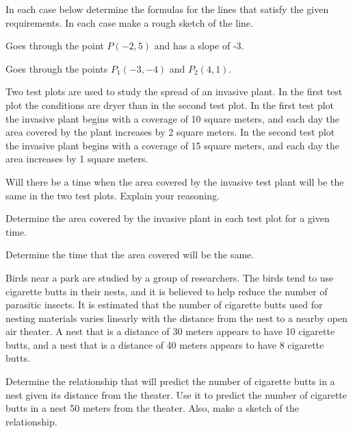 \begin{problem}
\item In each case below determine the formulas for the lines that
  satisfy the given requirements. In each case make a rough sketch of
  the line.

  \begin{subproblem}
  \item Goes through the point $P(-2,5)$ and has a slope of -3.
    \vfill
  \item Goes through the points $P_1(-3,-4)$ and $P_2(4,1)$.
    \vfill
  \end{subproblem}

  \clearpage

\item Two test plots are used to study the spread of an invasive
  plant. In the first test plot the conditions are dryer than in the
  second test plot. In the first test plot the invasive plant begins
  with a coverage of 10 square meters, and each day the area covered
  by the plant increases by 2 square meters. In the second test plot
  the invasive plant begins with a coverage of 15 square meters, and
  each day the area increases by 1 square meters.

  \begin{subproblem}
  \item Will there be a time when the area covered by the invasive
    test plant will be the same in the two test plots. Explain your
    reasoning.  
    \vfill

  \item Determine the area covered by the invasive plant in each test
    plot for a given time.
    \vfill

  \item Determine the time that the area covered will be the same.
    \vfill
  \end{subproblem}

  \clearpage

\item Birds near a park are studied by a group of researchers. The
  birds tend to use cigarette butts in their nests, and it is believed
  to help reduce the number of parasitic insects. It is estimated that
  the number of cigarette butts used for nesting materials varies
  linearly with the distance from the nest to a nearby open air
  theater. A nest that is a distance of 30 meters appears to have 10
  cigarette butts, and a nest that is a distance of 40 meters appears
  to have 8 cigarette butts.
  \begin{subproblem}
  \item Determine the relationship that will predict the number of
    cigarette butts in a nest given its distance from the theater.
    Use it to predict the number of cigarette butts in a nest 50
    meters from the theater. Also, make a sketch of the relationship.


\end{subproblem}
\end{problem}
